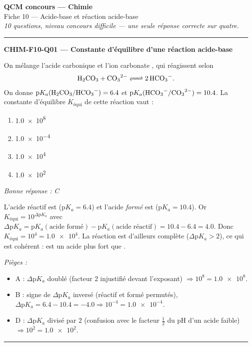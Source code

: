 \documentclass[11pt,a4paper]{article}
\begin{document}
\begin{center}
{\Large\bfseries QCM concours --- Chimie}\\[2pt]
{\large Fiche 10 --- Acide-base et réaction acide-base}\\[2pt]
\textit{10 questions, niveau concours difficile --- une seule réponse correcte sur quatre.}
\end{center}
\vspace{6pt}\hrule\vspace{10pt}

\noindent\textbf{CHIM-F10-Q01 --- Constante d'équilibre d'une réaction acide-base}\par
On mélange l'acide carbonique  et l'ion carbonate , qui réagissent selon
\[ \ce{H2CO3 + CO3^{2-} <=> 2 HCO3-}. \]
On donne $\mathrm{p}K_a(\ce{H2CO3}/\ce{HCO3-}) = \num{6.4}$ et $\mathrm{p}K_a(\ce{HCO3-}/\ce{CO3^{2-}}) = \num{10.4}$. La constante d'équilibre $K_{\text{équi}}$ de cette réaction vaut :
\begin{enumerate}[label=\Alph*)]
\item \num{1.0e8}
\item \num{1.0e-4}
\item \num{1.0e4}
\item \num{1.0e2}
\end{enumerate}
\textit{Bonne réponse : C}\par
L'acide réactif est  ($\mathrm{p}K_a = \num{6.4}$) et l'acide \emph{formé} est  ($\mathrm{p}K_a = \num{10.4}$). Or $K_{\text{équi}} = 10^{\Delta\mathrm{p}K_a}$ avec $\Delta\mathrm{p}K_a = \mathrm{p}K_a(\text{acide formé}) - \mathrm{p}K_a(\text{acide réactif}) = \num{10.4} - \num{6.4} = \num{4.0}$. Donc $K_{\text{équi}} = 10^{4} = \num{1.0e4}$. La réaction est d'ailleurs complète ($\Delta\mathrm{p}K_a > 2$), ce qui est cohérent :  est un acide plus fort que .\par
\textit{Pièges :}
\begin{itemize}
\item A : $\Delta\mathrm{p}K_a$ doublé (facteur 2 injustifié devant l'exposant) $\Rightarrow 10^{8} = \num{1.0e8}$.
\item B : signe de $\Delta\mathrm{p}K_a$ inversé (réactif et formé permutés), $\Delta\mathrm{p}K_a = \num{6.4}-\num{10.4} = \num{-4.0} \Rightarrow 10^{-4} = \num{1.0e-4}$.
\item D : $\Delta\mathrm{p}K_a$ divisé par 2 (confusion avec le facteur $\tfrac12$ du pH d'un acide faible) $\Rightarrow 10^{2} = \num{1.0e2}$.
\end{itemize}
\vspace{6pt}\hrule\vspace{8pt}
\end{document}
